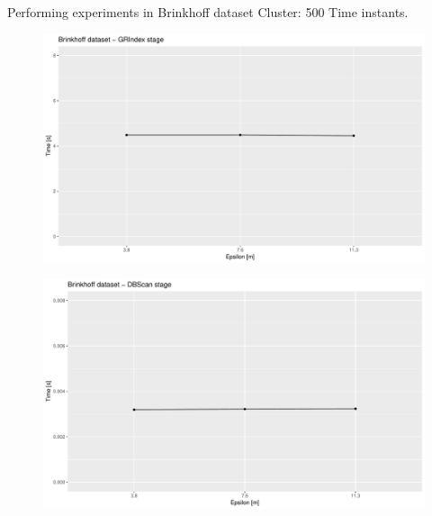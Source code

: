 \documentclass{beamer}
\begin{document}
\begin{frame}{Performing experiments in Brinkhoff dataset}
    {\small Cluster: 500 Time instants.}
    \centering
    \begin{minipage}{.5\textwidth}
        \begin{figure}
            \includegraphics[width=\textwidth]{ICPETesterClusterGRIndex}
        \end{figure}   
    \end{minipage}%
    \begin{minipage}{.5\textwidth}
        \begin{figure}
            \includegraphics[width=\textwidth]{ICPETesterClusterDBScan}
        \end{figure}   
    \end{minipage}
\end{frame}
\end{document}
